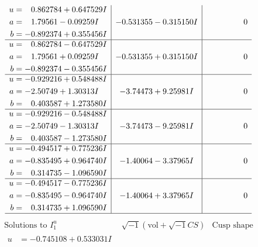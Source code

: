 \documentclass[1p]{elsarticle_modified}
\theoremstyle{definition}
\newcommand{\I}{\sqrt{-1}}
\begin{document}
$$\begin{array}{c|c|c}
\begin{aligned}
u &= \phantom{-}0.862784 + 0.647529 I \\
a &= \phantom{-}1.79561 - 0.09259 I \\
b &= -0.892374 + 0.355456 I\end{aligned}
 & -0.531355 - 0.315150 I & \phantom{-0.000000 } 0 \\ \hline\begin{aligned}
u &= \phantom{-}0.862784 - 0.647529 I \\
a &= \phantom{-}1.79561 + 0.09259 I \\
b &= -0.892374 - 0.355456 I\end{aligned}
 & -0.531355 + 0.315150 I & \phantom{-0.000000 } 0 \\ \hline\begin{aligned}
u &= -0.929216 + 0.548488 I \\
a &= -2.50749 + 1.30313 I \\
b &= \phantom{-}0.403587 + 1.273580 I\end{aligned}
 & -3.74473 + 9.25981 I & \phantom{-0.000000 } 0 \\ \hline\begin{aligned}
u &= -0.929216 - 0.548488 I \\
a &= -2.50749 - 1.30313 I \\
b &= \phantom{-}0.403587 - 1.273580 I\end{aligned}
 & -3.74473 - 9.25981 I & \phantom{-0.000000 } 0 \\ \hline\begin{aligned}
u &= -0.494517 + 0.775236 I \\
a &= -0.835495 + 0.964740 I \\
b &= \phantom{-}0.314735 - 1.096590 I\end{aligned}
 & -1.40064 - 3.37965 I & \phantom{-0.000000 } 0 \\ \hline\begin{aligned}
u &= -0.494517 - 0.775236 I \\
a &= -0.835495 - 0.964740 I \\
b &= \phantom{-}0.314735 + 1.096590 I\end{aligned}
 & -1.40064 + 3.37965 I & \phantom{-0.000000 } 0\\
 \hline 
 \end{array}$$\newpage$$\begin{array}{c|c|c}  
\text{Solutions to }I^u_{1}& \I (\text{vol} + \sqrt{-1}CS) & \text{Cusp shape}\\
 \hline 
\begin{aligned}
u &= -0.745108 + 0.533031 I \\

\end{aligned}
\end{array}$$
\end{document}
